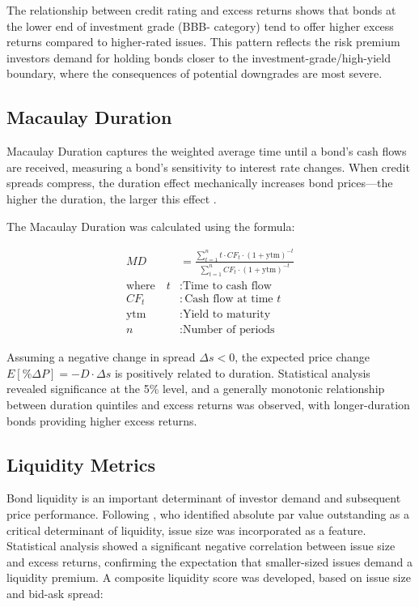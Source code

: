 The relationship between credit rating and excess returns shows that bonds at the lower end of investment grade (BBB- category) tend to offer higher excess returns compared to higher-rated issues. This pattern reflects the risk premium investors demand for holding bonds closer to the investment-grade/high-yield boundary, where the consequences of potential downgrades are most severe.

\subsection{Macaulay Duration}
Macaulay Duration captures the weighted average time until a bond's cash flows are received, measuring a bond's sensitivity to interest rate changes. When credit spreads compress, the duration effect mechanically increases bond prices—the higher the duration, the larger this effect \parencite[pp. 118 - 123]{Fabozzi2021TheEdition}.

The Macaulay Duration was calculated using the formula:

\begin{align}
MD &= \frac{\sum_{t=1}^{n} t \cdot CF_t \cdot (1 + \text{ytm})^{-t}}{\sum_{t=1}^{n} CF_t \cdot (1 + \text{ytm})^{-t}} \\
\text{where} \quad t &: \text{Time to cash flow} \nonumber\\
CF_t &: \text{Cash flow at time $t$} \nonumber\\
\text{ytm} &: \text{Yield to maturity} \nonumber\\
n &: \text{Number of periods} \nonumber
\end{align}

Assuming a negative change in spread $\Delta s < 0$, the expected price change $E[\%\Delta P] = -D \cdot \Delta s$ is positively related to duration. Statistical analysis revealed significance at the 5\% level, and a generally monotonic relationship between duration quintiles and excess returns was observed, with longer-duration bonds providing higher excess returns.

\subsection{Liquidity Metrics}
Bond liquidity is an important determinant of investor demand and subsequent price performance. Following \textcite{Hotchkiss2002TheAnalysis}, who identified absolute par value outstanding as a critical determinant of liquidity, issue size was incorporated as a feature. Statistical analysis showed a significant negative correlation between issue size and excess returns, confirming the expectation that smaller-sized issues demand a liquidity premium. A composite liquidity score was developed, based on issue size and bid-ask spread:

